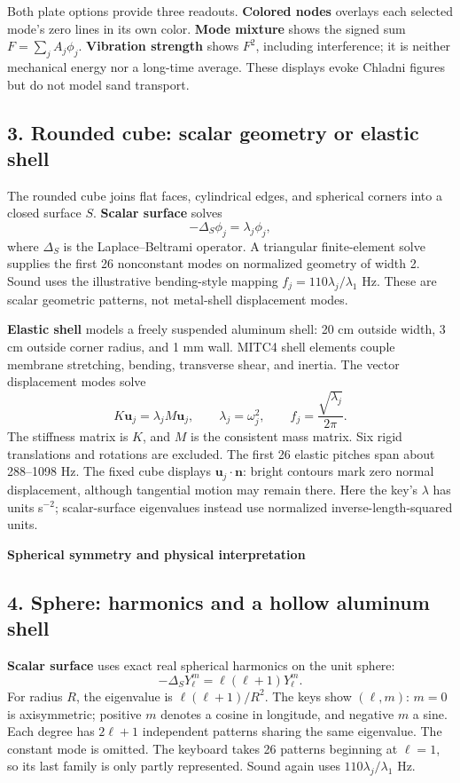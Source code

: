 \documentclass[11pt,letterpaper]{article}
\begin{document}
Both plate options provide three readouts. \textbf{Colored nodes} overlays each selected mode's zero lines in its own color. \textbf{Mode mixture} shows the signed sum \(F=\sum_j A_j\phi_j\). \textbf{Vibration strength} shows \(F^2\), including interference; it is neither mechanical energy nor a long-time average. These displays evoke Chladni figures but do not model sand transport.

\subsection{3. Rounded cube: scalar geometry or elastic shell}
The rounded cube joins flat faces, cylindrical edges, and spherical corners into a closed surface \(S\). \textbf{Scalar surface} solves
\[
 -\Delta_S\phi_j=\lambda_j\phi_j,
\]
where \(\Delta_S\) is the Laplace--Beltrami operator. A triangular finite-element solve supplies the first 26 nonconstant modes on normalized geometry of width 2. Sound uses the illustrative bending-style mapping \(f_j=110\lambda_j/\lambda_1\) Hz. These are scalar geometric patterns, not metal-shell displacement modes.

\textbf{Elastic shell} models a freely suspended aluminum shell: 20 cm outside width, 3 cm outside corner radius, and 1 mm wall. MITC4 shell elements couple membrane stretching, bending, transverse shear, and inertia. The vector displacement modes solve
\[
 K\mathbf u_j=\lambda_j M\mathbf u_j,
 \qquad \lambda_j=\omega_j^2,
 \qquad f_j=\frac{\sqrt{\lambda_j}}{2\pi}.
\]
The stiffness matrix is \(K\), and \(M\) is the consistent mass matrix. Six rigid translations and rotations are excluded. The first 26 elastic pitches span about 288--1098 Hz. The fixed cube displays \(\mathbf u_j\cdot\mathbf n\): bright contours mark zero normal displacement, although tangential motion may remain there. Here the key's \(\lambda\) has units s\(^{-2}\); scalar-surface eigenvalues instead use normalized inverse-length-squared units.

\newpage
{\large\bfseries Spherical symmetry and physical interpretation}\par
\subsection{4. Sphere: harmonics and a hollow aluminum shell}
\textbf{Scalar surface} uses exact real spherical harmonics on the unit sphere:
\[
 -\Delta_S Y_\ell^m=\ell(\ell+1)Y_\ell^m.
\]
For radius \(R\), the eigenvalue is \(\ell(\ell+1)/R^2\). The keys show \((\ell,m)\): \(m=0\) is axisymmetric; positive \(m\) denotes a cosine in longitude, and negative \(m\) a sine. Each degree has \(2\ell+1\) independent patterns sharing the same eigenvalue. The constant mode is omitted. The keyboard takes 26 patterns beginning at \(\ell=1\), so its last family is only partly represented. Sound again uses \(110\lambda_j/\lambda_1\) Hz.
\end{document}

